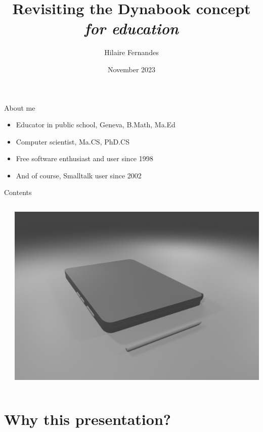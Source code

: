 \documentclass{beamer}
\title{Revisiting the Dynabook concept\\
\emph{for education}}
\author{Hilaire Fernandes}
\institute[DIP, Geneva]{Department of Public Instruction \\ Geneva}
\date{November 2023}
\begin{document}
\begin{frame}
  \titlepage
\end{frame}
%
\begin{frame}{About me}
  \fontsize{12pt}{30pt}\selectfont
  \begin{itemize}
  \item Educator in public school, Geneva, B.Math, Ma.Ed
  \item Computer scientist, Ma.CS, PhD.CS
  \item Free software enthusiast and user since 1998
  \item And of course, Smalltalk user since 2002
  \end{itemize}
\end{frame}
%
\begin{frame}{Contents}
  \begin{columns}
    \begin{column}{0.5\textwidth}
      \tableofcontents[hideallsubsections]      
    \end{column}
    \begin{column}{0.5\textwidth}
      \includegraphics[width=\textwidth]{image2-sm.png}      
    \end{column}
  \end{columns}
\end{frame}

\section{Why this presentation?}
\end{document}

